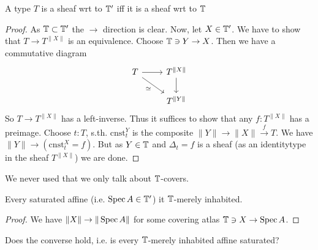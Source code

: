 \begin{lemma}
	A type $T$ is a sheaf wrt to $\mathbb{T}'$ iff it is a sheaf wrt to $\mathbb{T}$
\end{lemma}
\begin{proof}
	As $\mathbb{T} \subset \mathbb{T}'$ the $\rightarrow$ direction is clear. Now, let $X \in \mathbb{T}'$. We have to show that $T \to T^{\|X\|}$ is an equivalence. Choose $\mathbb{T} \ni Y \to X$. Then we have a commutative diagram
	\[\begin{tikzcd}
		T & {T^{\|X\|}} \\
		& {T^{\|Y\|}}
		\arrow[from=1-1, to=1-2]
		\arrow["\simeq"', from=1-1, to=2-2]
		\arrow[from=1-2, to=2-2]
	\end{tikzcd}\]
	So $T \to T^{\|X\|}$ has a left-inverse. Thus it suffices to show that any $f : T^{\|X\|}$ has a preimage. Choose $t : T$, s.th. $\mathrm{cnst}^Y_t$ is the composite $\|Y\| \to \|X\| \overset{f}{\to} T$. We have $\|Y\| \to (\mathrm{cnst}^X_t = f)$. But as $Y \in \mathbb{T}$ and $\Delta_t = f$ is a sheaf (as an identitytype in the sheaf $T^{\|X\|}$) we are done.
\end{proof}
\begin{rmk}
	We never used that we only talk about $\mathbb{T}$-covers.
\end{rmk}
\begin{lemma}
	Every saturated affine (i.e. $\operatorname{Spec} A \in \mathbb{T}'$) it $\mathbb{T}$-merely inhabited.     
\end{lemma}
\begin{proof}
	We have $\|X\| \to \|\operatorname{Spec} A\|$ for some covering atlas $\mathbb{T} \ni X \to \operatorname{Spec} A$.
\end{proof}

\begin{question}
	Does the converse hold, i.e. is every $\mathbb{T}$-merely inhabited affine saturated?    
\end{question}


